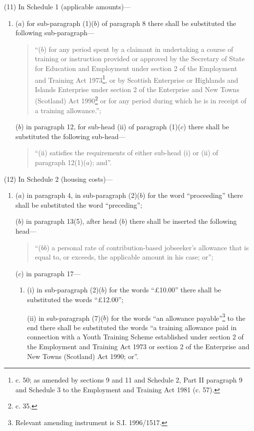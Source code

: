 \documentclass[12pt,a4paper]{article}
\begin{document}
(11) In Schedule 1 (applicable amounts)—
\begin{enumerate}\item[]
($a$) for sub-paragraph (1)($b$) of paragraph 8 there shall be substituted the following sub-paragraph—
\begin{quotation}
“($b$) for any period spent by a claimant in undertaking a course of training or instruction provided or approved by the Secretary of State for Education and Employment under section 2 of the Employment and Training Act 1973\footnote{ c. 50; as amended by sections 9 and 11 and Schedule 2, Part II paragraph 9 and Schedule 3 to the Employment and Training Act 1981 (c. 57).}, or by Scottish Enterprise or Highlands and Islands Enterprise under section 2 of the Enterprise and New Towns (Scotland) Act 1990\footnote{ c. 35.} or for any period during which he is in receipt of a training allowance.”;
\end{quotation}

($b$) in paragraph 12, for sub-head (ii) of paragraph (1)($c$) there shall be substituted the following sub-head—
\begin{quotation}
“(ii) satisfies the requirements of either sub-head (i) or (ii) of paragraph 12(1)($a$); and”.
\end{quotation}
\end{enumerate}

(12) In Schedule 2 (housing costs)—
\begin{enumerate}\item[]
($a$) in paragraph 4, in sub-paragraph (2)($b$) for the word “proceeding” there shall be substituted the word “preceding”;

($b$) in paragraph 13(5), after head ($b$) there shall be inserted the following head—
\begin{quotation}
“($bb$) a personal rate of contribution-based jobseeker’s allowance that is equal to, or exceeds, the applicable amount in his case; or”;
\end{quotation}

($c$) in paragraph 17—
\begin{enumerate}\item[]
(i) in sub-paragraph (2)($b$) for the words “£10.00” there shall be substituted the words “£12.00”;

(ii) in sub-paragraph (7)($b$) for the words “an allowance payable”\footnote{\frenchspacing Relevant amending instrument is S.I. 1996/1517.} to the end there shall be substituted the words “a training allowance paid in connection with a Youth Training Scheme established under section 2 of the Employment and Training Act 1973 or section 2 of the Enterprise and New Towns (Scotland) Act 1990; or”.
\end{enumerate}
\end{enumerate}
\end{document}
